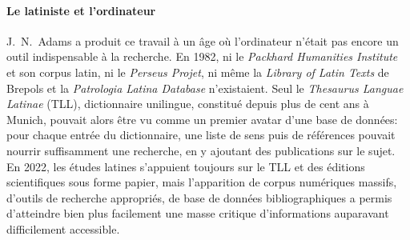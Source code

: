 \paragraph{Le latiniste et l'ordinateur}

J.~N.~Adams a produit ce travail à un âge où l'ordinateur n'était pas encore un outil indispensable à la recherche. En 1982, ni le \textit{Packhard Humanities Institute} et son corpus latin, ni le \textit{Perseus Projet}, ni même la \textit{Library of Latin Texts} de Brepols et la \textit{Patrologia Latina Database} n'existaient. Seul le \textit{Thesaurus Languae Latinae} (TLL), dictionnaire unilingue, constitué depuis plus de cent ans à Munich, pouvait alors être vu comme un premier avatar d'une base de données: pour chaque entrée du dictionnaire, une liste de sens puis de références pouvait nourrir suffisamment une recherche, en y ajoutant des publications sur le sujet. En 2022, les études latines s'appuient toujours sur le TLL et des éditions scientifiques sous forme papier, mais l'apparition de corpus numériques massifs, d'outils de recherche appropriés, de base de données bibliographiques a permis d'atteindre bien plus facilement une masse critique d'informations auparavant difficilement accessible.

